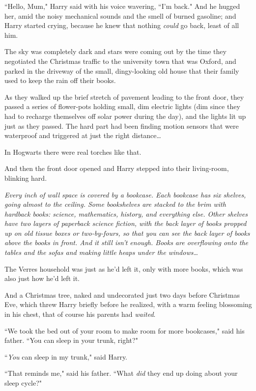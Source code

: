 ``Hello, Mum," Harry said with his voice wavering, ``I'm back." And he hugged her, amid the noisy mechanical sounds and the smell of burned gasoline; and Harry started crying, because he knew that nothing \emph{could} go back, least of all him.

\later

The sky was completely dark and stars were coming out by the time they negotiated the Christmas traffic to the university town that was Oxford, and parked in the driveway of the small, dingy-looking old house that their family used to keep the rain off their books.

As they walked up the brief stretch of pavement leading to the front door, they passed a series of flower-pots holding small, dim electric lights (dim since they had to recharge themselves off solar power during the day), and the lights lit up just as they passed. The hard part had been finding motion sensors that were waterproof and triggered at just the right distance{\ldots}

In Hogwarts there were real torches like that.

And then the front door opened and Harry stepped into their living-room, blinking hard.

\emph{Every inch of wall space is covered by a bookcase. Each bookcase has six shelves, going almost to the ceiling. Some bookshelves are stacked to the brim with hardback books: science, mathematics, history, and everything else. Other shelves have two layers of paperback science fiction, with the back layer of books propped up on old tissue boxes or two-by-fours, so that you can see the back layer of books above the books in front. And it still isn't enough. Books are overflowing onto the tables and the sofas and making little heaps under the windows{\ldots}}

The Verres household was just as he'd left it, only with more books, which was also just how he'd left it.

And a Christmas tree, naked and undecorated just two days before Christmas Eve, which threw Harry briefly before he realized, with a warm feeling blossoming in his chest, that of course his parents had \emph{waited}.

``We took the bed out of your room to make room for more bookcases," said his father. ``You can sleep in your trunk, right?"

``\emph{You} can sleep in my trunk," said Harry.

``That reminds me," said his father. ``What \emph{did} they end up doing about your sleep cycle?"

